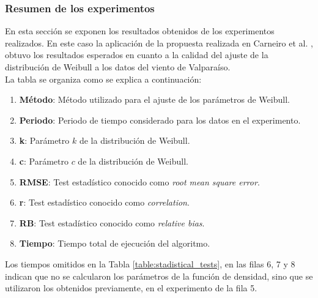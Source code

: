 \subsubsection{Resumen de los experimentos}
En esta sección se exponen los resultados obtenidos de los experimentos realizados. En este caso la aplicación de la propuesta realizada en Carneiro et al. \cite{Carneiro15}, obtuvo los resultados esperados en cuanto a la calidad del ajuste de la distribución de Weibull a los datos del viento de Valparaíso.\\
La tabla se organiza como se explica a continuación:
\begin{enumerate}
  \item \textbf{Método}: Método utilizado para el ajuste de los parámetros de Weibull.
  \item \textbf{Periodo}: Periodo de tiempo considerado para los datos en el experimento.
  \item \textbf{k}: Parámetro $k$ de la distribución de Weibull.
  \item \textbf{c}: Parámetro $c$ de la distribución de Weibull.
  \item \textbf{RMSE}: Test estadístico conocido como \emph{root mean square error}.
  \item \textbf{r}: Test estadístico conocido como \emph{correlation}.
  \item \textbf{RB}: Test estadístico conocido como \emph{relative bias}.
  \item \textbf{Tiempo}: Tiempo total de ejecución del algoritmo.
\end{enumerate}
Los tiempos omitidos en la Tabla \ref{table:stadistical_tests}, en las filas 6, 7 y 8 indican que no se calcularon los parámetros de la función de densidad, sino que se utilizaron los obtenidos previamente, en el experimento de la fila 5.
